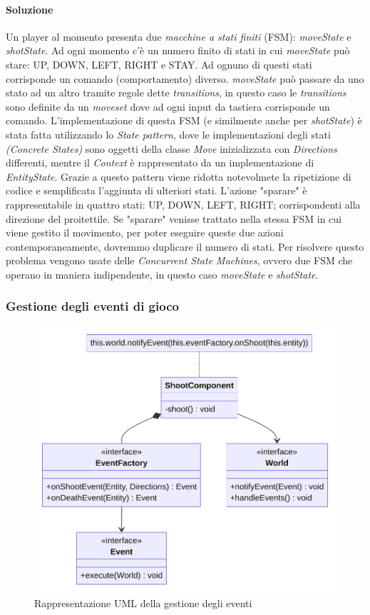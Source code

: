 \documentclass[a4paper,12pt]{report}
\begin{document}
\paragraph{Soluzione} Un player al momento presenta due \textit{macchine a stati finiti} (FSM): 
\textit{moveState} e \textit{shotState}. Ad ogni momento c'è un numero finito di stati in cui \textit{moveState} può stare: UP, DOWN, LEFT, RIGHT e STAY. 
Ad ognuno di questi stati corrisponde un comando (comportamento) diverso. \textit{moveState} può passare da uno stato ad un altro tramite regole dette \textit{transitions}, 
in questo caso le \textit{transitions} sono definite da un \textit{moveset} dove ad ogni input da tastiera corrisponde un comando. 
L'implementazione di questa FSM (e similmente anche per \textit{shotState}) è stata fatta utilizzando lo \textit{State pattern}, dove le implementazioni degli stati \textit{(Concrete States)} sono oggetti 
della classe \textit{Move} inizializzata con \textit{Directions} differenti, mentre il \textit{Context} è rappresentato da un implementazione di \textit{EntityState}. 
Grazie a questo pattern viene ridotta notevolmete la ripetizione di codice e semplificata l'aggiunta di ulteriori stati.
L'azione "sparare" è rappresentabile in quattro stati: UP, DOWN, LEFT, RIGHT; corrispondenti alla direzione del proitettile. Se "sparare" venisse trattato nella stessa FSM in cui viene gestito il movimento, per poter eseguire queste due azioni contemporaneamente, dovremmo duplicare il numero di stati.
Per risolvere questo problema vengono usate delle \textit{Concurrent State Machines}, ovvero due FSM che operano in maniera indipendente, in questo caso \textit{moveState} e \textit{shotState}.

\subsubsection{Gestione degli eventi di gioco}

\begin{figure}[H]
\centering{}
\includegraphics[scale=0.75]{img/EventsUML}
\caption{Rappresentazione UML della gestione degli eventi}
\label{img:eventsHandling}
\end{figure}
\end{document}
